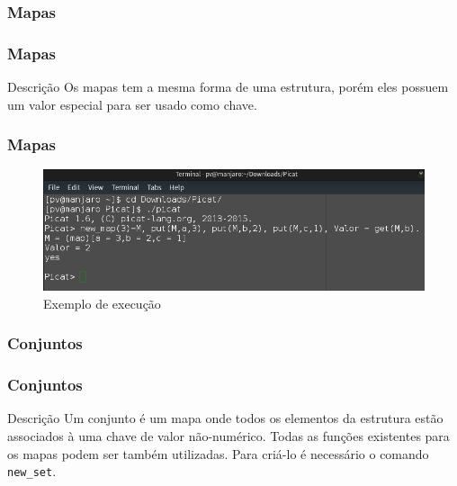 \documentclass[sans]{beamer}
\begin{document}

\subsubsection{Mapas}
\begin{frame}[fragile]   %
\frametitle{Mapas}
\begin{block}{Descrição}
  Os mapas tem a mesma forma de uma estrutura, porém eles possuem um valor especial para ser usado como chave. 
\end{block}
\end{frame}


\begin{frame}[fragile]   %
\frametitle{Mapas}

 \begin{figure}[!ht]
 \centering
 \includegraphics[width=.9\textwidth]{picatmapas.png}
 \caption{Exemplo de execução}
 \end{figure}

\end{frame}


\subsubsection{Conjuntos}
\begin{frame}[fragile]   %
\frametitle{Conjuntos}
\begin{block}{Descrição}
  Um conjunto é um mapa onde todos os elementos da estrutura estão associados à uma chave de valor não-numérico. Todas
  as funções existentes para os mapas podem ser também utilizadas.  
  Para criá-lo é necessário o comando \texttt{new\_set}.
\end{block}
\end{frame}
\end{document}
